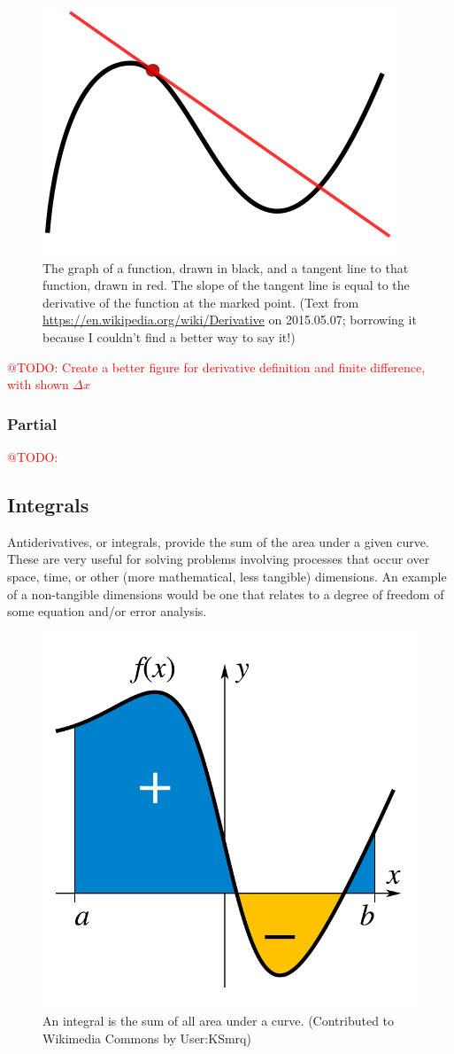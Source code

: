 \documentclass[a4paper,10pt]{scrartcl}
\makeatletter
\newcommand{\todo}[1]{\textcolor{red}{@TODO: #1}}
\makeatother
\begin{document}
\begin{figure}[!ht]
\begin{center}
\includegraphics[width=.5\linewidth]{figures/NumericalAndMath/400px-Tangent_to_a_curve.png}
\end{center}
\caption{The graph of a function, drawn in black, and a tangent line to that function, drawn in red. The slope of the tangent line is equal to the derivative of the function at the marked point. (Text from \url{https://en.wikipedia.org/wiki/Derivative} on 2015.05.07; borrowing it because I couldn't find a better way to say it!)}
\end{figure}

\todo{Create a better figure for derivative definition and finite difference, with shown $\Delta x$}

\subsubsection{Partial}

\todo{}

\subsection{Integrals}

Antiderivatives, or integrals, provide the sum of the area under a given curve. These are very useful for solving problems involving processes that occur over space, time, or other (more mathematical, less tangible) dimensions. An example of a non-tangible dimensions would be one that relates to a degree of freedom of some equation and/or error analysis.

\begin{figure}[!ht]
\begin{center}
\includegraphics[width=.5\linewidth]{figures/NumericalAndMath/IntegralExample.pdf}
\end{center}
\caption{An integral is the sum of all area under a curve. (Contributed to Wikimedia Commons by User:KSmrq)}
\end{figure}
\end{document}
